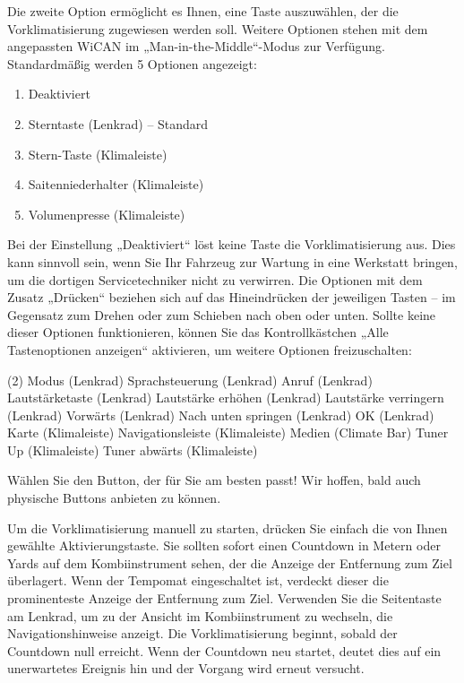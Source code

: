 \documentclass[superscriptaddress,onecolumn,floatfix]{revtex4-2}
\begin{document}
Die zweite Option ermöglicht es Ihnen, eine Taste auszuwählen, der die Vorklimatisierung zugewiesen werden soll. Weitere Optionen stehen mit dem angepassten WiCAN im „Man-in-the-Middle“-Modus zur Verfügung. Standardmäßig werden 5 Optionen angezeigt:
\begin{enumerate}
  \item Deaktiviert
  \item Sterntaste (Lenkrad) – Standard
  \item Stern-Taste (Klimaleiste)
  \item Saitenniederhalter (Klimaleiste)
  \item Volumenpresse (Klimaleiste)
\end{enumerate}
Bei der Einstellung „Deaktiviert“ löst keine Taste die Vorklimatisierung aus. Dies kann sinnvoll sein, wenn Sie Ihr Fahrzeug zur Wartung in eine Werkstatt bringen, um die dortigen Servicetechniker nicht zu verwirren. Die Optionen mit dem Zusatz „Drücken“ beziehen sich auf das Hineindrücken der jeweiligen Tasten – im Gegensatz zum Drehen oder zum Schieben nach oben oder unten. Sollte keine dieser Optionen funktionieren, können Sie das Kontrollkästchen „Alle Tastenoptionen anzeigen“ aktivieren, um weitere Optionen freizuschalten:
\begin{tasks}(2)
  \task Modus (Lenkrad)
  \task Sprachsteuerung (Lenkrad)
  \task Anruf (Lenkrad)
  \task Lautstärketaste (Lenkrad)
  \task Lautstärke erhöhen (Lenkrad)
  \task Lautstärke verringern (Lenkrad)
  \task Vorwärts (Lenkrad)
  \task Nach unten springen (Lenkrad)
  \task OK (Lenkrad)
  \task Karte (Klimaleiste)
  \task Navigationsleiste (Klimaleiste)
  \task Medien (Climate Bar)
  \task Tuner Up (Klimaleiste)
  \task Tuner abwärts (Klimaleiste)
\end{tasks}
Wählen Sie den Button, der für Sie am besten passt! Wir hoffen, bald auch physische Buttons anbieten zu können.

Um die Vorklimatisierung manuell zu starten, drücken Sie einfach die von Ihnen gewählte Aktivierungstaste. Sie sollten sofort einen Countdown in Metern oder Yards auf dem Kombiinstrument sehen, der die Anzeige der Entfernung zum Ziel überlagert. Wenn der Tempomat eingeschaltet ist, verdeckt dieser die prominenteste Anzeige der Entfernung zum Ziel. Verwenden Sie die Seitentaste am Lenkrad, um zu der Ansicht im Kombiinstrument zu wechseln, die Navigationshinweise anzeigt. Die Vorklimatisierung beginnt, sobald der Countdown null erreicht. Wenn der Countdown neu startet, deutet dies auf ein unerwartetes Ereignis hin und der Vorgang wird erneut versucht. 
\end{document}

